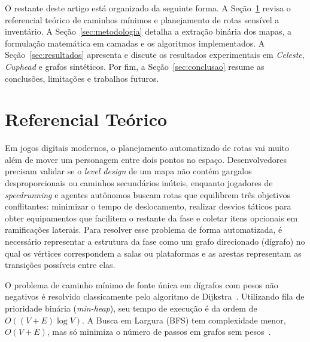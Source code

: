 \documentclass[conference]{IEEEtran}
\begin{document}
O restante deste artigo est\'a organizado da seguinte forma. A Se\c{c}\~ao~\ref{sec:referencial} revisa o referencial te\'orico de caminhos m\'inimos e planejamento de rotas sens\'ivel a invent\'ario. A Se\c{c}\~ao~\ref{sec:metodologia} detalha a extra\c{c}\~ao bin\'aria dos mapas, a formula\c{c}\~ao matem\'atica em camadas e os algoritmos implementados. A Se\c{c}\~ao~\ref{sec:resultados} apresenta e discute os resultados experimentais em \textit{Celeste}, \textit{Cuphead} e grafos sint\'eticos. Por fim, a Se\c{c}\~ao~\ref{sec:conclusao} resume as conclus\~oes, limita\c{c}\~oes e trabalhos futuros.

\section{Referencial Te\'orico}
\label{sec:referencial}

Em jogos digitais modernos, o planejamento automatizado de rotas vai muito al\'em de mover um personagem entre dois pontos no espa\c{c}o. Desenvolvedores precisam validar se o \textit{level design} de um mapa n\~ao cont\'em gargalos desproporcionais ou caminhos secund\'arios in\'uteis, enquanto jogadores de \textit{speedrunning} e agentes aut\^onomos buscam rotas que equilibrem tr\^es objetivos conflitantes: minimizar o tempo de deslocamento, realizar desvios t\'aticos para obter equipamentos que facilitem o restante da fase e coletar itens opcionais em ramifica\c{c}\~oes laterais. Para resolver esse problema de forma automatizada, \'e necess\'ario representar a estrutura da fase como um grafo direcionado (d\'igrafo) no qual os v\'ertices correspondem a salas ou plataformas e as arestas representam as transi\c{c}\~oes poss\'iveis entre elas.

O problema de caminho m\'inimo de fonte \'unica em d\'igrafos com pesos n\~ao negativos \'e resolvido classicamente pelo algoritmo de Dijkstra~\cite{dijkstra1959}. Utilizando fila de prioridade bin\'aria (\textit{min-heap}), seu tempo de execu\c{c}\~ao \'e da ordem de $O((V + E)\log V)$. A Busca em Largura (BFS) tem complexidade menor, $O(V + E)$, mas s\'o minimiza o n\'umero de passos em grafos sem pesos~\cite{cormen2022}.
\end{document}
